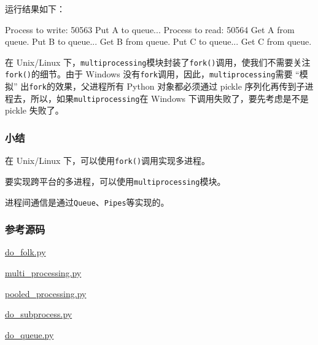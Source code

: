 运行结果如下：

\begin{pythoncode}
Process to write: 50563
Put A to queue...
Process to read: 50564
Get A from queue.
Put B to queue...
Get B from queue.
Put C to queue...
Get C from queue.
\end{pythoncode}

在 Unix/Linux
下，\texttt{multiprocessing}模块封装了\texttt{fork()}调用，使我们不需要关注\texttt{fork()}的细节。由于
Windows 没有\texttt{fork}调用，因此，\texttt{multiprocessing}需要
``模拟'' 出\texttt{fork}的效果，父进程所有 Python 对象都必须通过 pickle
序列化再传到子进程去，所以，如果\texttt{multiprocessing}在 Windows
下调用失败了，要先考虑是不是 pickle 失败了。

\hypertarget{ux5c0fux7ed3}{%
\subsubsection{小结}\label{ux5c0fux7ed3}}

在 Unix/Linux 下，可以使用\texttt{fork()}调用实现多进程。

要实现跨平台的多进程，可以使用\texttt{multiprocessing}模块。

进程间通信是通过\texttt{Queue}、\texttt{Pipes}等实现的。

\hypertarget{ux53c2ux8003ux6e90ux7801}{%
\subsubsection{参考源码}\label{ux53c2ux8003ux6e90ux7801}}

\href{https://github.com/michaelliao/learn-python3/blob/master/samples/multitask/do_folk.py}{do\_folk.py}

\href{https://github.com/michaelliao/learn-python3/blob/master/samples/multitask/multi_processing.py}{multi\_processing.py}

\href{https://github.com/michaelliao/learn-python3/blob/master/samples/multitask/pooled_processing.py}{pooled\_processing.py}

\href{https://github.com/michaelliao/learn-python3/blob/master/samples/multitask/do_subprocess.py}{do\_subprocess.py}

\href{https://github.com/michaelliao/learn-python3/blob/master/samples/multitask/do_queue.py}{do\_queue.py}

